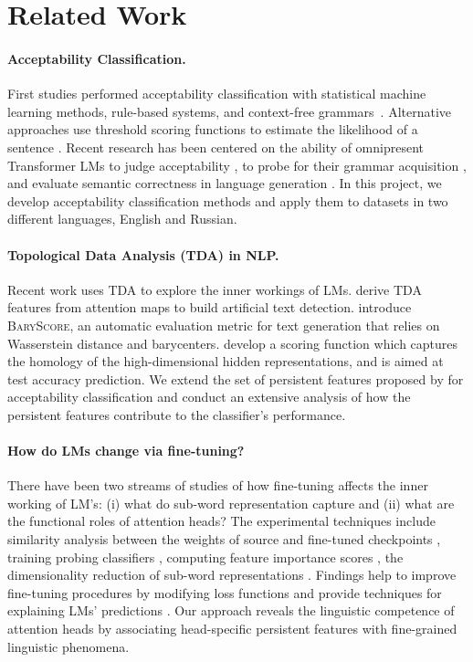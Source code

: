 \documentclass[11pt]{article}
\begin{document}
\section{Related Work}
\paragraph{Acceptability Classification.} First studies performed acceptability classification with statistical machine learning methods, rule-based systems, and context-free grammars~\cite{cherry-quirk-2008-discriminative,wagner2009judging,post-2011-judging}. Alternative approaches use threshold scoring functions to estimate the likelihood of a sentence \cite{lau-etal-2020-furiously}. Recent research has been centered on the ability of omnipresent Transformer LMs to judge acceptability \cite{wang-etal-2018-glue}, to probe for their grammar acquisition \cite{zhang-etal-2021-need}, and evaluate semantic correctness in language generation \cite{batra-etal-2021-building}. 
In this project, we develop acceptability classification methods and apply them to datasets in two different languages, English and Russian.


\paragraph{Topological Data Analysis (TDA) in NLP.}  Recent work uses TDA to explore the inner workings of LMs.  \citet{kushnareva-etal-2021-artificial} derive TDA features from attention maps to build artificial text detection. \citet{colombo-etal-2021-automatic} introduce \textsc{BaryScore}, an automatic evaluation metric for text generation that relies on Wasserstein distance and barycenters. \citet{chauhan2022bertops} develop a scoring function which captures the homology of the high-dimensional hidden representations, and is aimed at test accuracy prediction. 
We extend the set of persistent features proposed by \citet{cherniavskii-etal-2022-acceptability} for acceptability classification and conduct an extensive analysis of how the persistent features contribute to the classifier's performance.


\paragraph{How do LMs change via fine-tuning?} There have been two streams of studies of how fine-tuning affects the inner working of LM's: (i) what do sub-word representation capture and (ii) what are the functional roles of attention heads? The experimental techniques include similarity analysis between the weights of source and fine-tuned checkpoints \cite{clark-etal-2019-bert}, training probing classifiers \cite{durrani-etal-2021-transfer}, computing feature importance scores \cite{atanasova-etal-2020-diagnostic}, the dimensionality reduction of sub-word representations \cite{alammar-2021-ecco}. Findings help to improve fine-tuning procedures by modifying loss functions  \cite{elazar-etal-2021-measuring} and provide techniques for explaining LMs' predictions \cite{danilevsky-etal-2020-survey}. Our approach reveals the linguistic competence of attention heads by associating head-specific persistent features with fine-grained linguistic phenomena. 
\end{document}
